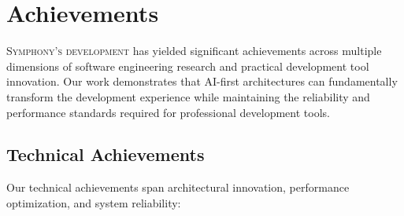 
\section*{Achievements}

\lettrine{S}{ymphony's development} has yielded significant achievements across multiple dimensions of software engineering research and practical development tool innovation. Our work demonstrates that AI-first architectures can fundamentally transform the development experience while maintaining the reliability and performance standards required for professional development tools.

\subsection*{Technical Achievements}

Our technical achievements span architectural innovation, performance optimization, and system reliability:

